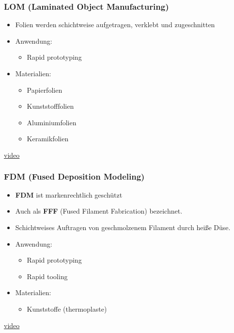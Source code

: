\begin{frame}
  \frametitle{LOM (Laminated Object Manufacturing)}
  \pause
  \begin{itemize}
    \item Folien werden schichtweise aufgetragen, verklebt und zugeschnitten \pause
    \item Anwendung:
    \begin{itemize}
      \item Rapid prototyping \pause
    \end{itemize}
    \item Materialien:
    \begin{itemize}
      \item Papierfolien
      \item Kunststofffolien
      \item Aluminiumfolien
      \item Keramikfolien \pause
    \end{itemize}
  \end{itemize}
  \href{https://youtu.be/6C7bjzIW610}{video}
\end{frame}

\begin{frame}
  \frametitle{FDM (Fused Deposition Modeling)}
  \pause
  \begin{itemize}
    \item \textbf{FDM} ist markenrechtlich geschützt \pause
    \item Auch als \textbf{FFF} (Fused Filament Fabrication) bezeichnet. \pause
    \item Schichtweises Auftragen von geschmolzenem Filament durch heiße Düse. \pause
    \item Anwendung:
    \begin{itemize}
      \item Rapid prototyping
      \item Rapid tooling \pause
    \end{itemize}
    \item Materialien:
    \begin{itemize}
      \item Kunststoffe (thermoplaste)
    \end{itemize}
  \end{itemize}
  \href{https://youtu.be/aubLuCFIejc}{video}
\end{frame}

